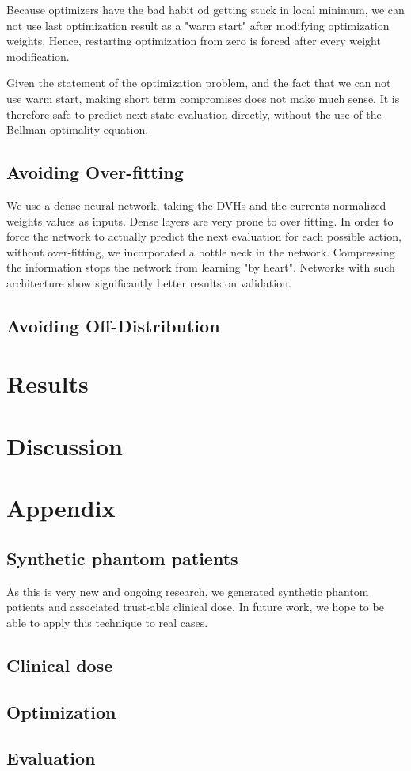 Because optimizers have the bad habit od getting stuck in local minimum, we can not use last optimization result as a "warm start" after modifying optimization weights.
Hence, restarting optimization from zero is forced after every weight modification.

Given the statement of the optimization problem, and the fact that we can not use warm start, making short term compromises does not make much sense.
It is therefore safe to predict next state evaluation directly, without the use of the Bellman optimality equation.

\subsection{Avoiding Over-fitting}
We use a dense neural network, taking the DVHs and the currents normalized weights values as inputs.
Dense layers are very prone to over fitting.
In order to force the network to actually predict the next evaluation for each possible action, without over-fitting, we incorporated a bottle neck in the network.
Compressing the information stops the network from learning "by heart".
Networks with such architecture show significantly better results on validation.

\subsection{Avoiding Off-Distribution}


\section{Results}

\section{Discussion}


\section*{Appendix}

\subsection*{Synthetic phantom patients}
As this is very new and ongoing research, we generated synthetic phantom patients and associated trust-able clinical dose.
In future work, we hope to be able to apply this technique to real cases.

\subsection*{Clinical dose}

\subsection*{Optimization}

\subsection*{Evaluation}

